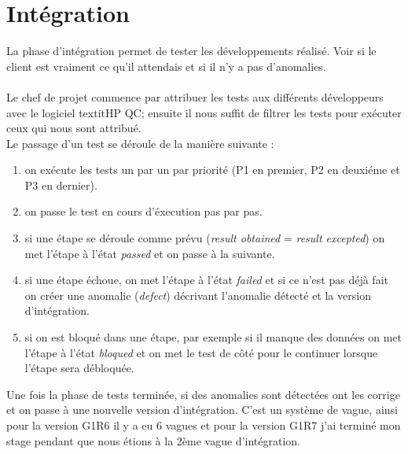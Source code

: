 \section{Intégration}
La phase d'intégration permet de tester les développements réalisé. Voir si le client est vraiment ce qu'il attendais et si il n'y a pas d'anomalies.
\\\\
Le chef de projet commence par attribuer les tests aux différents développeurs avec le logiciel textit{HP QC}; ensuite il nous suffit de filtrer les tests pour exécuter ceux qui nous sont attribué.
\\Le passage d'un test se déroule de la manière suivante :
\begin{enumerate}
\item on exécute les tests un par un par priorité (P1 en premier, P2 en deuxiéme et P3 en dernier).
\item on passe le test en cours d'éxecution pas par pas.
\item si une étape se déroule comme prévu (\textit{result obtained} = \textit{result excepted}) on met l'étape à l'état \textit{passed} et on passe à la suivante.
\item si une étape échoue, on met l'étape à l'état \textit{failed} et si ce n'est pas déjà fait on créer une anomalie (\textit{defect}) décrivant l'anomalie détecté et la version d'intégration.
\item si on est bloqué dans une étape, par exemple si il manque des données on met l'étape à l'état \textit{bloqued} et on
 met le test de côté pour le continuer lorsque l'étape sera débloquée.\\
 \end{enumerate}

 Une fois la phase de tests terminée, si des anomalies sont détectées ont les corrige et on passe à une nouvelle version d'intégration. C'est un système de vague, ainsi pour la version G1R6 il y a eu 6 vagues et pour la version G1R7 j'ai terminé mon stage pendant que nous étions à la 2ème vague d'intégration.

